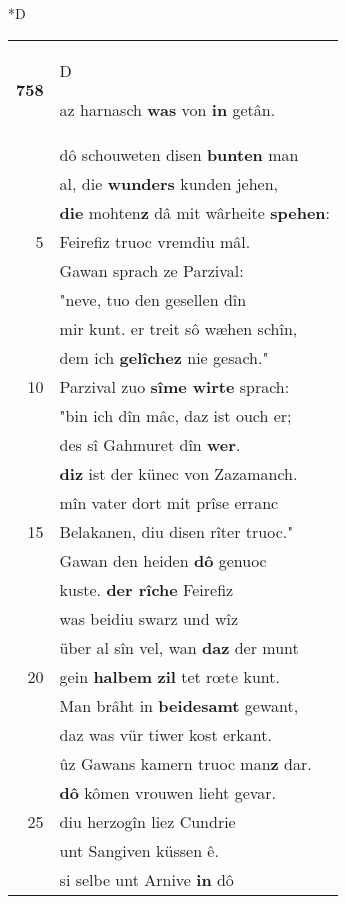 \documentclass[8pt,a4paper,notitlepage]{article}
\begin{document}
\begin{table}[ht]
\begin{minipage}[t]{0.5\linewidth}
\small
\begin{center}*D
\end{center}
\begin{tabular}{rl}
\textbf{758} & \begin{large}D\end{large}az harnasch \textbf{was} von \textbf{in} getân.\\ 
 & dô schouweten disen \textbf{bunten} man\\ 
 & al, die \textbf{wunders} kunden jehen,\\ 
 & \textbf{die} mohten\textbf{z} dâ mit wârheite \textbf{spehen}:\\ 
5 & Feirefiz truoc vremdiu mâl.\\ 
 & Gawan sprach ze Parzival:\\ 
 & "neve, tuo den gesellen dîn\\ 
 & mir kunt. er treit sô wæhen schîn,\\ 
 & dem ich \textbf{gelîchez} nie gesach."\\ 
10 & Parzival zuo \textbf{sîme wirte} sprach:\\ 
 & "bin ich dîn mâc, daz ist ouch er;\\ 
 & des sî Gahmuret dîn \textbf{wer}.\\ 
 & \textbf{diz} ist der künec von Zazamanch.\\ 
 & mîn vater dort mit prîse erranc\\ 
15 & Belakanen, diu disen rîter truoc."\\ 
 & Gawan den heiden \textbf{dô} genuoc\\ 
 & kuste. \textbf{der rîche} Feirefiz\\ 
 & was beidiu swarz und wîz\\ 
 & über al sîn vel, wan \textbf{daz} der munt\\ 
20 & gein \textbf{halbem} \textbf{zil} tet rœte kunt.\\ 
 & Man brâht in \textbf{beidesamt} gewant,\\ 
 & daz was vür tiwer kost erkant.\\ 
 & ûz Gawans kamern truoc man\textbf{z} dar.\\ 
 & \textbf{dô} kômen vrouwen lieht gevar.\\ 
25 & diu herzogîn liez Cundrie\\ 
 & unt Sangiven küssen ê.\\ 
 & si selbe unt Arnive \textbf{in} dô\\ 

\end{tabular}
\end{minipage}
\end{table}
\end{document}
